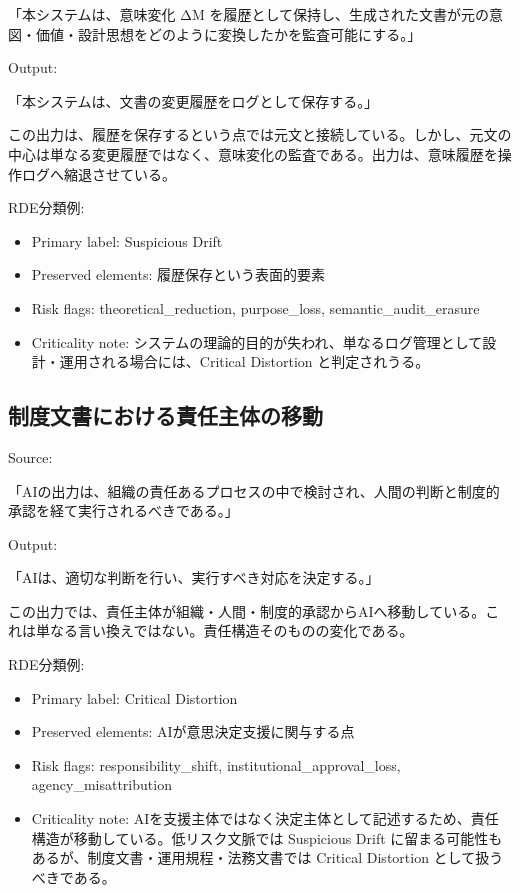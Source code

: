 \documentclass[
  a4paper]{ltjsarticle}
\providecommand{\tightlist}{%
  \setlength{\itemsep}{0pt}\setlength{\parskip}{0pt}}
\begin{document}
「本システムは、意味変化 ΔM
を履歴として保持し、生成された文書が元の意図・価値・設計思想をどのように変換したかを監査可能にする。」

Output:

「本システムは、文書の変更履歴をログとして保存する。」

この出力は、履歴を保存するという点では元文と接続している。しかし、元文の中心は単なる変更履歴ではなく、意味変化の監査である。出力は、意味履歴を操作ログへ縮退させている。

RDE分類例:

\begin{itemize}
\tightlist
\item
  Primary label: Suspicious Drift
\item
  Preserved elements: 履歴保存という表面的要素
\item
  Risk flags: theoretical\_reduction, purpose\_loss, semantic\_audit\_erasure
\item
  Criticality note: システムの理論的目的が失われ、単なるログ管理として設計・運用される場合には、Critical Distortion と判定されうる。
\end{itemize}

\subsection{制度文書における責任主体の移動}\label{ux5236ux5ea6ux6587ux66f8ux306bux304aux3051ux308bux8cacux4efbux4e3bux4f53ux306eux79fbux52d5}

Source:

「AIの出力は、組織の責任あるプロセスの中で検討され、人間の判断と制度的承認を経て実行されるべきである。」

Output:

「AIは、適切な判断を行い、実行すべき対応を決定する。」

この出力では、責任主体が組織・人間・制度的承認からAIへ移動している。これは単なる言い換えではない。責任構造そのものの変化である。

RDE分類例:

\begin{itemize}
\tightlist
\item
  Primary label: Critical Distortion
\item
  Preserved elements: AIが意思決定支援に関与する点
\item
  Risk flags: responsibility\_shift, institutional\_approval\_loss, agency\_misattribution
\item
  Criticality note: AIを支援主体ではなく決定主体として記述するため、責任構造が移動している。低リスク文脈では Suspicious Drift に留まる可能性もあるが、制度文書・運用規程・法務文書では Critical Distortion として扱うべきである。
\end{itemize}
\end{document}
